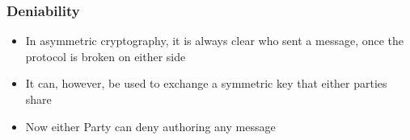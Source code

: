 \documentclass[
	aspectratio=169,
	xetex,
]{beamer}
\begin{document}
\begin{frame}
	\frametitle{Deniability}
	\begin{overlayarea}{\textwidth}{\textheight}
		\begin{itemize}
			\item<2-> In asymmetric cryptography, it is always clear who sent a message, once the protocol is broken on either side
			\item<3-> It can, however, be used to exchange a symmetric key that either parties share
			\item<4-> Now either Party can deny authoring any message
		\end{itemize}
		\-\\
		\begin{center}
		\end{center} 
	\end{overlayarea} 
\end{frame} 
\end{document}

